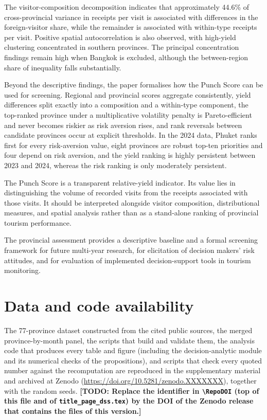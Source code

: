 \documentclass[11pt,a4paper]{article}
\newif\ifdraft \drafttrue
\newcommand{\todo}[1]{\ifdraft{\color{red}\textbf{[TODO: #1]}}\fi}
\theoremstyle{plain}\newtheorem{proposition}{Proposition}
\theoremstyle{definition}\newtheorem{definition}{Definition}
\newcommand{\RepoDOI}{10.5281/zenodo.XXXXXXX}   %
\begin{document}
The visitor-composition decomposition indicates that approximately 44.6\% of cross-provincial variance in receipts per visit is associated with differences in the foreign-visitor share, while the remainder is associated with within-type receipts per visit. Positive spatial autocorrelation is also observed, with high-yield clustering concentrated in southern provinces. The principal concentration findings remain high when Bangkok is excluded, although the between-region share of inequality falls substantially.

Beyond the descriptive findings, the paper formalises how the Punch Score can be used for screening. Regional and provincial scores aggregate consistently, yield differences split exactly into a composition and a within-type component, the top-ranked province under a multiplicative volatility penalty is Pareto-efficient and never becomes riskier as risk aversion rises, and rank reversals between candidate provinces occur at explicit thresholds. In the 2024 data, Phuket ranks first for every risk-aversion value, eight provinces are robust top-ten priorities and four depend on risk aversion, and the yield ranking is highly persistent between 2023 and 2024, whereas the risk ranking is only moderately persistent.

The Punch Score is a transparent relative-yield indicator. Its value lies in distinguishing the volume of recorded visits from the receipts associated with those visits. It should be interpreted alongside visitor composition, distributional measures, and spatial analysis rather than as a stand-alone ranking of provincial tourism performance.

The provincial assessment provides a descriptive baseline and a formal screening framework for future multi-year research, for elicitation of decision makers' risk attitudes, and for evaluation of implemented decision-support tools in tourism monitoring.

\section*{Data and code availability}
The 77-province dataset constructed from the cited public sources, the merged province-by-month panel, the scripts that build and validate them, the analysis code that produces every table and figure (including the decision-analytic module and its numerical checks of the propositions), and scripts that check every quoted number against the recomputation are reproduced in the supplementary material and archived at Zenodo (\url{https://doi.org/\RepoDOI}), together with the random seeds. \todo{Replace the identifier in \texttt{\textbackslash RepoDOI} (top of this file and of \texttt{title\_page\_dss.tex}) by the DOI of the Zenodo release that contains the files of this version.}
\end{document}
